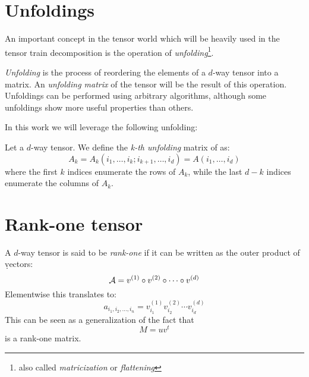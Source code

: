 

\section{Unfoldings}
An important concept in the tensor world which will be heavily used in the tensor train decomposition is the operation of \emph{unfolding}\footnote{also called \emph{matricization} or \emph{flattening}}.

\emph{Unfolding} is the process of reordering the elements of a $d$-way tensor into a matrix. An \emph{unfolding matrix} of the tensor will be the result of this operation. Unfoldings can be performed using arbitrary algorithms, although some unfoldings show more useful properties than others.

In this work we will leverage the following unfolding:

\begin{Def}
  Let \A a $d$-way tensor. We define the \emph{k-th unfolding} matrix of \A as:
  \begin{equation} \label{def:unfolding}
    A_k = A_k(i_1,\dots,i_k;i_{k+1},\dots,i_d) = A(i_1,\dots,i_d)
  \end{equation}
where the first $k$ indices enumerate the rows of $A_k$, while the last $d - k$ indices enumerate the columns of $A_k$.
\end{Def}

\section{Rank-one tensor}
A $d$-way tensor \A is said to be \emph{rank-one} if it can be written as the outer product of \d vectors:
\begin{equation}
  \mathcal{A} = v^{(1)} \circ v^{(2)} \circ \cdots \circ v^{(d)}
\end{equation}
Elementwise this translates to:
\begin{equation}
  a_{i_1,i_2,\ldots,i_n} = v_{i_1}^{(1)} v_{i_2}^{(2)} \cdots v_{i_d}^{(d)}
\end{equation}
This can be seen as a generalization of the fact that
\begin{equation*}
  M = u v^t
\end{equation*}
is a rank-one matrix.

